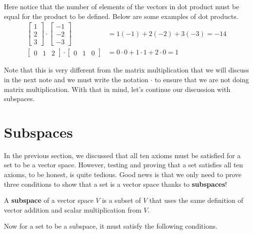\documentclass[../main.tex]{subfiles}
\begin{document}
Here notice that the number of elements of the vectors in dot product
must be equal for the product to be defined. Below are some examples
of dot products.
\begin{align*}
\begin{bmatrix}
    1 \\
    2 \\
    3
\end{bmatrix}
\cdot
\begin{bmatrix}
    -1 \\
    -2 \\
    -3
\end{bmatrix}
&= 1(-1) + 2(-2) + 3(-3)
= -14 \\
\begin{bmatrix}
    0 & 1 & 2
\end{bmatrix}
\cdot
\begin{bmatrix}
    0 & 1 & 0
\end{bmatrix}
&= 0 \cdot 0 + 1 \cdot 1 + 2 \cdot 0
= 1
\end{align*}

Note that this is very different from the matrix multiplication
that we will discuss in the next note and we must write the
notation $\cdot$ to ensure that we are not doing matrix
multiplication. With that in mind, let's continue our discussion
with subspaces.

\section{Subspaces}

In the previous section, we discussed that all ten axioms must be
satisfied for a set to be a vector space. However, testing and
proving that a set satisfies all ten axioms, to be honest, is quite
tedious. Good news is that we only need to prove three conditions to
show that a set is a vector space thanks to \textbf{subspaces}!

\begin{definition}
A \textbf{subspace} of a vector space $V$ is a subset of $V$ that uses
the same definition of vector addition and scalar multiplication from
$V$.
\end{definition}

Now for a set to be a subspace, it must satisfy the following
conditions.
\end{document}

